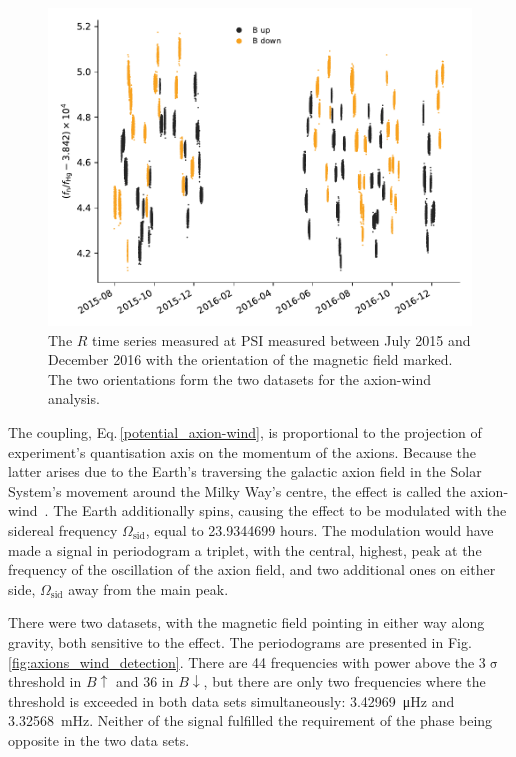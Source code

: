 \begin{figure}
  \centering
  \includegraphics[width=\linewidth]{gfx/axions/wind_winddeltah4mm_time_domain_inset_no_yerr.pdf}
  \caption{The $R$ time series measured at PSI measured between July 2015 and December 2016 with the orientation of the magnetic field marked. The two orientations form the two datasets for the axion-wind analysis.}\label{fig:axions_wind_time_domain}
\end{figure}

The coupling, Eq.\,\ref{potential_axion-wind}, is proportional to the projection of experiment's quantisation axis on the momentum of the axions.
Because the latter arises due to the Earth's traversing the galactic axion field in the Solar System's movement around the Milky Way's centre, the effect is called the axion-wind~\cite{Stadnik2014A}.
The Earth additionally spins, causing the effect to be modulated with the sidereal frequency $\Omega_\text{sid}$, equal to \num[detect-all=true]{23.9344699} hours. 
The modulation would have made a signal in periodogram a triplet, with the central, highest, peak at the frequency of the oscillation of the axion field, and two additional ones on either side, $\Omega_\text{sid}$ away from the main peak.

There were two datasets, with the magnetic field pointing in either way along gravity, both sensitive to the effect. The periodograms are presented in Fig.\,\ref{fig:axions_wind_detection}. There are 44 frequencies with power above the 3$\upsigma$ threshold in $B\uparrow$ and 36 in $B\downarrow$, but there are only two frequencies where the threshold is exceeded in both data sets simultaneously: \SI{3.42969}{\micro\hertz} and \SI{3.32568}{\milli\hertz}. Neither of the signal fulfilled the requirement of the phase being opposite in the two data sets.

